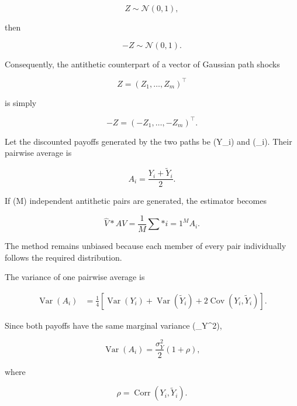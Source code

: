 \documentclass[12pt,a4paper]{report}
\begin{document}
\begin{equation}
Z\sim\mathcal{N}(0,1),
\end{equation}

then

\begin{equation}
-Z\sim\mathcal{N}(0,1).
\end{equation}

Consequently, the antithetic counterpart of a vector of Gaussian path shocks

\begin{equation}
Z
=
(Z_1,\ldots,Z_m)^\top
\end{equation}

is simply

\begin{equation}
-Z
=
(-Z_1,\ldots,-Z_m)^\top.
\end{equation}

Let the discounted payoffs generated by the two paths be (Y_i) and (_i). Their pairwise average is

\begin{equation}
A_i
=
\frac{Y_i+\widetilde{Y}_i}{2}.
\end{equation}

If (M) independent antithetic pairs are generated, the estimator becomes

\begin{equation}
\widehat{V}*{AV}
=
\frac{1}{M}
\sum*{i=1}^{M}
A_i.
\end{equation}

The method remains unbiased because each member of every pair individually follows the required distribution.

The variance of one pairwise average is

\begin{align}
\operatorname{Var}(A_i)
&=
\frac{1}{4}
\left[
\operatorname{Var}(Y_i)
+
\operatorname{Var}(\widetilde{Y}_i)
+
2\operatorname{Cov}(Y_i,\widetilde{Y}_i)
\right].
\end{align}

Since both payoffs have the same marginal variance (\sigma_Y^2),

\begin{equation}
\operatorname{Var}(A_i)
=
\frac{\sigma_Y^2}{2}
(1+\rho),
\end{equation}

where

\begin{equation}
\rho
=
\operatorname{Corr}
(Y_i,\widetilde{Y}_i).
\end{equation}
\end{document}
